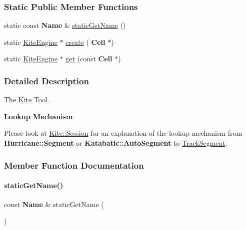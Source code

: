 \subsubsection*{Static Public Member Functions}
\begin{DoxyCompactItemize}
\item 
static const \textbf{ Name} \& \hyperlink{classKite_1_1KiteEngine_a802eee6265da8d536db52d412f8a4afd}{static\+Get\+Name} ()
\item 
static \hyperlink{classKite_1_1KiteEngine}{Kite\+Engine} $\ast$ \hyperlink{classKite_1_1KiteEngine_a520d92a22c1becdc0fbbec927365db21}{create} (\textbf{ Cell} $\ast$)
\item 
static \hyperlink{classKite_1_1KiteEngine}{Kite\+Engine} $\ast$ \hyperlink{classKite_1_1KiteEngine_a9905ab1f7a970bc947adb8ddf54e55e1}{get} (const \textbf{ Cell} $\ast$)
\end{DoxyCompactItemize}


\subsubsection{Detailed Description}
The \hyperlink{namespaceKite}{Kite} Tool. 

{\bfseries Lookup Mechanism}

Please look at \hyperlink{classKite_1_1Session}{Kite\+::\+Session} for an explanation of the lookup mechanism from \textbf{ Hurricane\+::\+Segment} or \textbf{ Katabatic\+::\+Auto\+Segment} to \hyperlink{classKite_1_1TrackSegment}{Track\+Segment}. 

\subsubsection{Member Function Documentation}
\mbox{\label{classKite_1_1KiteEngine_a802eee6265da8d536db52d412f8a4afd}} 
\paragraph{\texorpdfstring{static\+Get\+Name()}{staticGetName()}}
{\footnotesize\ttfamily const \textbf{ Name} \& static\+Get\+Name (\begin{DoxyParamCaption}{ }\end{DoxyParamCaption})\hspace{0.3cm}{\ttfamily [static]}}

